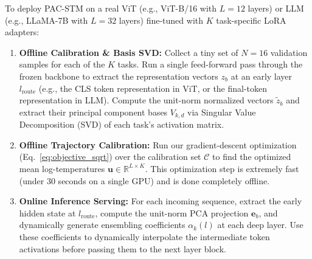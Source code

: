 To deploy PAC-STM on a real ViT (e.g., ViT-B/16 with $L=12$ layers) or LLM (e.g., LLaMA-7B with $L=32$ layers) fine-tuned with $K$ task-specific LoRA adapters:
\begin{enumerate}
    \item \textbf{Offline Calibration \& Basis SVD:} Collect a tiny set of $N=16$ validation samples for each of the $K$ tasks. Run a single feed-forward pass through the frozen backbone to extract the representation vectors $z_b$ at an early layer $l_{\text{route}}$ (e.g., the CLS token representation in ViT, or the final-token representation in LLM). Compute the unit-norm normalized vectors $\tilde{z}_b$ and extract their principal component bases $V_{k, d}$ via Singular Value Decomposition (SVD) of each task's activation matrix.
    \item \textbf{Offline Trajectory Calibration:} Run our gradient-descent optimization (Eq.~\ref{eq:objective_sqrt}) over the calibration set $\mathcal{C}$ to find the optimized mean log-temperatures $\mathbf{u} \in \mathbb{R}^{L \times K}$. This optimization step is extremely fast (under 30 seconds on a single GPU) and is done completely offline.
    \item \textbf{Online Inference Serving:} For each incoming sequence, extract the early hidden state at $l_{\text{route}}$, compute the unit-norm PCA projection $\mathbf{e}_b$, and dynamically generate ensembling coefficients $\alpha_k(l)$ at each deep layer. Use these coefficients to dynamically interpolate the intermediate token activations before passing them to the next layer block.
\end{enumerate}

